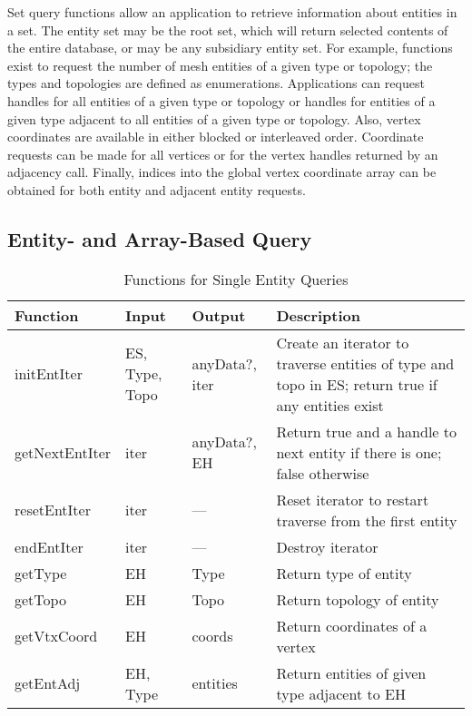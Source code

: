 Set query functions allow an application to retrieve information about
entities in a set.  The entity set may be the root set, which will
return selected contents of the entire database, or may be any
subsidiary entity set.  For example, functions exist to request the
number of mesh entities of a given type or topology; the types and
topologies are defined as enumerations.  Applications can request
handles for all entities of a given type or topology or handles for
entities of a given type adjacent to all entities of a given type or
topology.  Also, vertex coordinates are available in either blocked or
interleaved order. Coordinate requests can be made for all vertices or
for the vertex handles returned by an adjacency call. Finally, indices
into the global vertex coordinate array can be obtained for both entity
and adjacent entity requests.

\subsection{Entity- and Array-Based Query\label{sub:Ent-Interface}}

\begin{table}[tbp]
\caption{Functions for Single Entity Queries}\label{table:Entity}
{\small
\begin{tabular}{|p{1.25in}|p{0.75in}|p{0.75in}|p{223pt}|}
\hline 
Function&
Input&
Output&
Description\tabularnewline
\hline
\hline 
initEntIter&
ES, Type, Topo&
anyData?, iter&
Create an iterator to traverse entities of type and topo in ES; return
true if any entities exist\tabularnewline
\hline 
getNextEntIter&
iter&
anyData?, EH&
Return true and a handle to next entity if there is one; false otherwise\tabularnewline
\hline 
resetEntIter&
iter&
---&
Reset iterator to restart traverse from the first entity\tabularnewline
\hline 
endEntIter&
iter&
---&
Destroy iterator\tabularnewline
\hline 
\hline 
getType&
EH&
Type&
Return type of entity\tabularnewline
\hline 
getTopo&
EH&
Topo&
Return topology of entity\tabularnewline
\hline 
getVtxCoord&
EH&
coords&
Return coordinates of a vertex\tabularnewline
\hline 
getEntAdj&
EH, Type&
entities&
Return entities of given type adjacent to EH\tabularnewline
\hline
\end{tabular}
}
\end{table}


